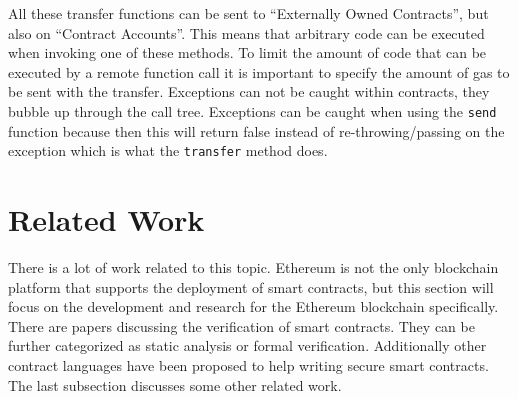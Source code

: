 \documentclass[a4paper]{article}
\begin{document}
All these transfer functions can be sent to ``Externally Owned Contracts'', but also on ``Contract Accounts''. This means that arbitrary code can be executed when invoking one of these methods. To limit the amount of code that can be executed by a remote function call it is important to specify the amount of gas to be sent with the transfer. Exceptions can not be caught within contracts, they bubble up through the call tree. Exceptions can be caught when using the \texttt{send} function because then this will return false instead of re-throwing/passing on the exception which is what the \texttt{transfer} method does.

\newpage
\section{Related Work}
\label{sec:RelatedWork}
There is a lot of work related to this topic. Ethereum is not the only blockchain platform that supports the deployment of smart contracts, but this section will focus on the development and research for the Ethereum blockchain specifically. There are papers discussing the verification of smart contracts. They can be further categorized as static analysis or formal verification. Additionally other contract languages have been proposed to help writing secure smart contracts. The last subsection discusses some other related work.
\end{document}
